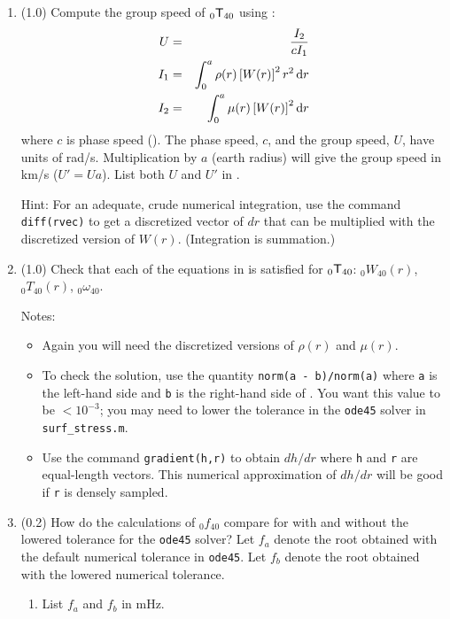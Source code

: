 \documentclass[11pt,titlepage,fleqn]{article}
\newcommand{\tnl}[2]{\mbox{$_{#1}\ssT_{#2}$}}
\begin{document}
\begin{enumerate}
\item (1.0) Compute the group speed of \tnl{0}{40} using \citep[][Eq. 11.67]{DT}:
%
\begin{eqnarray}
U &=& \frac{I_2}{cI_1}
\label{group}
\\
I_1 &=& \int_0^a \rho(r) \left[W(r)\right]^2 r^2 \, \mathrm{d} r
\\
I_2 &=& \int_0^a \mu(r) \left[W(r)\right]^2 \mathrm{d} r
\end{eqnarray}
%
where $c$ is phase speed (). %
The phase speed, $c$, and the group speed, $U$, have units of rad/s. Multiplication by $a$ (earth radius) will give the group speed in km/s ($U' = Ua$). List both $U$ and $U'$ in .

Hint: For an adequate, crude numerical integration, use the command \verb+diff(rvec)+ to get a discretized vector of $dr$ that can be multiplied with the discretized version of $W(r)$. (Integration is summation.)

\pagebreak
\item (1.0) Check that each of the equations in  is satisfied for \tnl{0}{40}: $_0W_{40}(r)$, $_0T_{40}(r)$, $_0\omega_{40}$.

Notes:
%
\begin{itemize}
\item Again you will need the discretized versions of $\rho(r)$ and $\mu(r)$.

\item To check the solution, use the quantity \verb+norm(a - b)/norm(a)+ where \verb+a+ is the left-hand side and \verb+b+ is the right-hand side of . You want this value to be $< 10^{-3}$; you may need to lower the tolerance in the \verb+ode45+ solver in \verb+surf_stress.m+.

\item Use the command \verb+gradient(h,r)+ to obtain $dh/dr$ where \verb+h+ and \verb+r+ are equal-length vectors. This numerical approximation of $dh/dr$ will be good if \verb+r+ is densely sampled.
\end{itemize}

\item (0.2)  How do the calculations of $_0f_{40}$ compare for with and without the lowered tolerance for the \verb+ode45+ solver? 
Let $f_a$ denote the root obtained with the default numerical tolerance in \verb+ode45+. Let $f_b$ denote the root obtained with the lowered numerical tolerance. 
%
\begin{enumerate}
\item
List $f_a$ and $f_b$ in mHz.


\end{enumerate}
\end{enumerate}
\end{document}
